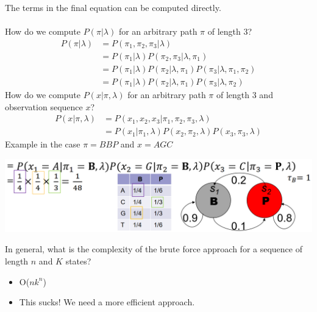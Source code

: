 \documentclass[10pt]{article}
\begin{document}
The terms in the final equation can be computed directly.\\\\
How do we compute $P(\pi|\lambda)$ for an arbitrary path $\pi$ of length 3?
\begin{align*}
    P(\pi|\lambda) &= P(\pi_1, \pi_2, \pi_3|\lambda)\\
    &= P(\pi_1|\lambda) P(\pi_2, \pi_3|\lambda, \pi_1)\\
    &= P(\pi_1|\lambda) P(\pi_2|\lambda, \pi_1) P(\pi_3|\lambda, \pi_1, \pi_2)\\
    &= P(\pi_1|\lambda) P(\pi_2|\lambda, \pi_1) P(\pi_3|\lambda, \pi_2)
\end{align*}
How do we compute $P(x|\pi, \lambda)$ for an arbitrary path $\pi$ of length 3 and observation sequence $x$?
\begin{align*}
    P(x|\pi, \lambda) &= P(x_1, x_2, x_3 | \pi_1, \pi_2, \pi_3, \lambda)\\
    &= P(x_1|\pi_1, \lambda) P(x_2, \pi_2, \lambda) P(x_3, \pi_3, \lambda)
\end{align*}
Example in the case $\pi = BBP$ and $x = AGC$
\begin{center} 
	\includegraphics*[width=\textwidth]{W9_13.png} 
\end{center}
In general, what is the complexity of the brute force approach for a sequence of length $n$ and $K$ states?
\begin{itemize}
	\item O($nk^n$)
	\item This sucks! We need a more efficient approach.
\end{itemize}
\end{document}

